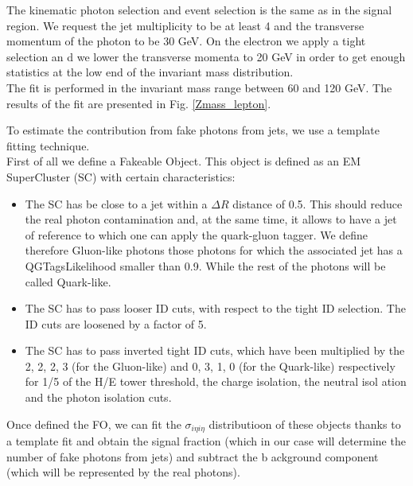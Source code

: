The kinematic photon selection and event selection is the same as in the signal region. We request the jet multiplicity to be at least 4 and the transverse momentum of the photon to be 30 GeV. On the electron we apply a tight 
selection an
d we lower the transverse momenta to 20 GeV in order to get enough statistics at the low end of the invariant mass distribution. \\

The fit is performed in the invariant mass range between 60 and 120 GeV. The results of the fit are presented in Fig. \ref{Zmass_lepton}.



To estimate the contribution from fake photons from jets, we use a template fitting technique. \\

First of all we define a Fakeable Object. This object is defined as an EM SuperCluster (SC) with certain characteristics:

\begin{itemize}

\item The SC has be close to a jet within a $\Delta R$ distance of 0.5. This should reduce the real photon contamination and, at the same time, it allows to have a jet of reference to which one can apply the quark-gluon tagger. We 
define 
therefore Gluon-like photons those photons for which the associated jet has a QGTagsLikelihood smaller than 0.9. While the rest of the photons will be called Quark-like.
\item The SC has to pass looser ID cuts, with respect to the tight ID selection. The ID cuts are loosened by a factor of 5.
\item The SC has to pass inverted tight ID cuts, which have been multiplied by the 2, 2, 2, 3 (for the Gluon-like) and 0, 3, 1, 0 (for the Quark-like) respectively for 1/5 of the H/E tower threshold, the charge isolation, the 
neutral isol
ation and the photon isolation cuts.

\end{itemize}

Once defined the FO, we can fit the $\sigma_{i \eta i \eta}$ distributioon of these objects thanks to a template fit and obtain the signal fraction (which in our case will determine the number of fake photons from jets) and 
subtract the b
ackground component (which will be represented by the real photons). \\

